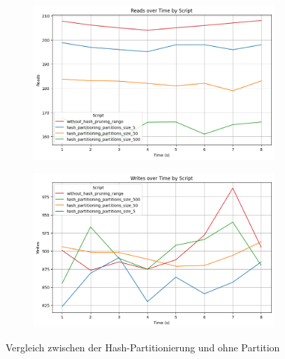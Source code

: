 \vspace{-4pt}
\begin{figure}[H]
	\centering
	\begin{subfigure}[t]{0.48\textwidth}
		\includegraphics[width=\textwidth]{PNGs/Script/Partition/hash-partition/Reads}
	\end{subfigure}
	\hfill
	\begin{subfigure}[t]{0.48\textwidth}
		\includegraphics[width=\textwidth]{PNGs/Script/Partition/hash-partition/Writes}
	\end{subfigure}
	\vspace{-8pt}
	\caption[Hash-Partitionierung: Variationen der Partitionsanzahl]{Vergleich zwischen der Hash-Partitionierung und ohne Partition}
	\label{fig:hash-partition}
\end{figure}
\vspace{-12pt}